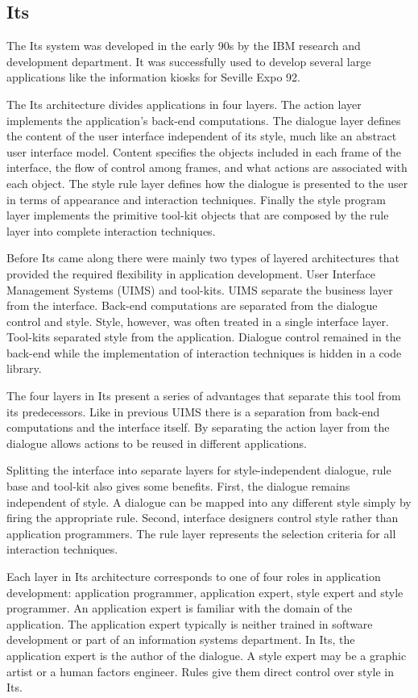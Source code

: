 \subsection{Its}
\label{subsection:ITS}
The Its\cite{ITS} system was developed in the early 90s by the IBM research and development department. It was successfully used to develop several large applications like the information kiosks for Seville Expo 92.

The Its architecture divides applications in four layers. The action layer implements the application's back-end computations. The dialogue layer defines the content of the user interface independent of its style, much like an abstract user interface model. Content specifies the objects included in each frame of the interface, the flow of control among frames, and what actions are associated with each object. The style rule layer defines how the dialogue is presented to the user in terms of appearance and interaction techniques. Finally the style program layer implements the primitive tool-kit objects that are composed by the rule layer into complete interaction techniques.

Before Its came along there were mainly two types of layered architectures that provided the required flexibility in application development. User Interface Management Systems (UIMS) and tool-kits. UIMS separate the business layer from the interface. Back-end computations are separated from the dialogue control and style. Style, however, was often treated in a single interface layer. Tool-kits separated style from the application. Dialogue control remained in the back-end while the implementation of interaction techniques is hidden in a code library.

The four layers in Its present a series of advantages that separate this tool from its predecessors. Like in previous UIMS there is a separation from back-end computations and the interface itself. By separating the action layer from the dialogue allows actions to be reused in different applications.

Splitting the interface into separate layers for style-independent dialogue, rule base and tool-kit also gives some benefits. First, the dialogue remains independent of style. A dialogue can be mapped into any different style simply by firing the appropriate rule. Second, interface designers control style rather than application programmers. The rule layer represents the selection criteria for all interaction techniques.

Each layer in Its architecture corresponds to one of four roles in application development: application programmer, application expert, style expert and style programmer. An application expert is familiar with the domain of the application. The application expert typically is neither trained in software development or part of an information systems department. In Its, the application expert is the author of the dialogue. A style expert may be a graphic artist or a human factors engineer. Rules give them direct control over style in Its.

